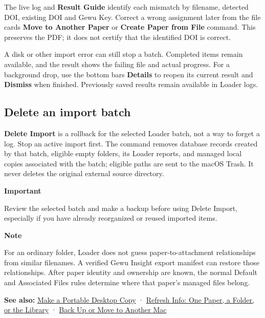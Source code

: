 \documentclass[10pt,letterpaper,oneside]{scrreprt}
\newenvironment{GewuRelated}{\par\nobreak\vspace{3pt}\nobreak\begingroup\small\sffamily\begin{samepage}\noindent}{\par\end{samepage}\endgroup}
\renewenvironment{quote}
  {\Needspace{5\baselineskip}\begin{tcolorbox}[enhanced,breakable,colback=GewuPale,colframe=GewuPale,boxrule=0pt,
    borderline west={1.6pt}{0pt}{GewuBlue},arc=1.2mm,left=2.5mm,right=2.5mm,top=1.7mm,bottom=1.7mm,
    before skip=4pt,after skip=5pt,fontupper=\color{GewuInk}\small]}
  {\end{tcolorbox}}
\begin{document}
The live log and \textbf{Result Guide} identify each mismatch by filename, detected DOI, existing DOI and Gewu Key. Correct a wrong assignment later from the file card\textquotesingle s \textbf{Move to Another Paper} or \textbf{Create Paper from File} command. This preserves the PDF; it does not certify that the identified DOI is correct.

A disk or other import error can still stop a batch. Completed items remain available, and the result shows the failing file and actual progress. For a background drop, use the bottom bar\textquotesingle s \textbf{Details} to reopen its current result and \textbf{Dismiss} when finished. Previously saved results remain available in Loader logs.

\subsection{Delete an import batch}\label{delete-an-import-batch}

\textbf{Delete Import} is a rollback for the selected Loader batch, not a way to forget a log. Stop an active import first. The command removes database records created by that batch, eligible empty folders, its Loader reports, and managed local copies associated with the batch; eligible paths are sent to the macOS Trash. It never deletes the original external source directory.

\begin{quote}
\textbf{Important}

Review the selected batch and make a backup before using Delete Import, especially if you have already reorganized or reused imported items.
\end{quote}

\begin{quote}
\textbf{Note}

For an ordinary folder, Loader does not guess paper-to-attachment relationships from similar filenames. A verified Gewu Insight export manifest can restore those relationships. After paper identity and ownership are known, the normal Default and Associated Files rules determine where that paper's managed files belong.
\end{quote}

\begin{GewuRelated}
\textbf{See also:} \hyperref[desktop-copy]{Make a Portable Desktop Copy} · \hyperref[loader-maintenance]{Refresh Info: One Paper, a Folder, or the Library} · \hyperref[backup-migrate]{Back Up or Move to Another Mac}
\end{GewuRelated}
\end{document}
